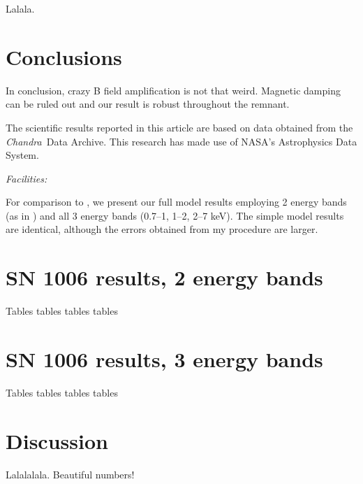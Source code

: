 \documentclass[manuscript]{aastex}  %
\newcommand{\Chandra}{\textit{Chandra}\ }
\begin{document}
Lalala.

\section{Conclusions}

In conclusion, crazy B field amplification is not that weird.
Magnetic damping can be ruled out and our result is robust throughout the remnant.

\acknowledgments

The scientific results reported in this article are based on data obtained from
the \Chandra Data Archive.
This research has made use of NASA's Astrophysics Data System.

{\it Facilities:} 

\appendix

For comparison to , we present our full model results
employing 2 energy bands (as in ) and all 3 energy
bands (0.7--1, 1--2, 2--7 keV).  The simple model results are identical,
although the errors obtained from my procedure are larger.

\section{SN 1006 results, 2 energy bands}  %

Tables tables tables tables

\section{SN 1006 results, 3 energy bands}

Tables tables tables tables

\section{Discussion}

Lalalalala.  Beautiful numbers!


\end{document}

